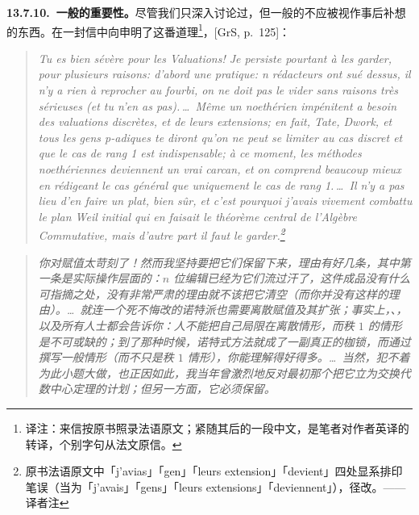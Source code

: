 \textbf{13.7.10.\ 一般\trValuationRing{}的重要性。}\quad 尽管我们只深入讨论过\trDVR，但一般的\trValuationRing{}不应被视作事后补想的东西。\trSerre{}在一封信中向\trGrothendieck{}申明了这番道理\footnote{译注：来信按原书照录法语原文；紧随其后的一段中文，是笔者对作者英译的转译，个别字句从法文原信。}，[GrS, p.~125]：
\begin{quote}\itshape
Tu es bien sévère pour les Valuations!
Je persiste pourtant à les garder, pour plusieurs raisons:
d'abord une pratique: n rédacteurs ont sué dessus,
il n'y a rien à reprocher au fourbi,
on ne doit pas le vider
sans raisons très sérieuses (et tu n'en as pas).\,\ldots\
Même un noethérien impénitent a besoin
des valuations discrètes, et de leurs extensions;
en fait, Tate, Dwork, et tous les gens p-adiques
te diront qu'on ne peut se limiter au cas discret
et que le cas de rang 1 est indispensable;
à ce moment, les méthodes noethériennes
deviennent un vrai carcan,
et on comprend beaucoup mieux
en rédigeant le cas général
que uniquement le cas de rang 1.\,\ldots\
Il n'y a pas lieu d'en faire un plat,
bien sûr,
et c'est pourquoi j'avais vivement
combattu le plan Weil initial
qui en faisait le théorème central
de l'Algèbre Commutative,
mais d'autre part il faut le garder.\footnote{原书法语原文中「j'avias」「gen」「leurs extension」「devient」四处显系排印笔误（当为「j'avais」「gens」「leurs extensions」「deviennent」），径改。——译者注}
\end{quote}
\begin{quote}\itshape
你对赋值太苛刻了！然而我坚持要把它们保留下来，理由有好几条，其中第一条是实际操作层面的：$n$ 位编辑已经为它们流过汗了，这件成品没有什么可指摘之处，没有非常严肃的理由就不该把它清空（而你并没有这样的理由）。\ldots\ 就连一个死不悔改的诺特派也需要离散赋值及其扩张；事实上，\trTate、\trDwork，以及所有\trPadic{}人士都会告诉你：人不能把自己局限在离散情形，而秩 $1$ 的情形是不可或缺的；到了那种时候，诺特式方法就成了一副真正的枷锁，而通过撰写一般情形（而不只是秩 $1$ 情形），你能理解得好得多。\ldots\ 当然，犯不着为此小题大做，也正因如此，我当年曾激烈地反对\trWeil{}最初那个把它立为交换代数中心定理的计划；但另一方面，它必须保留。
\end{quote}
